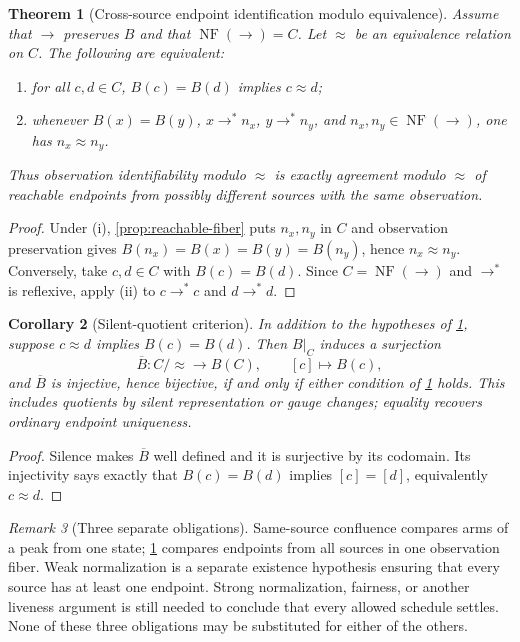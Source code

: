 \documentclass[11pt]{article}
\newtheorem{theorem}{Theorem}[section]
\newtheorem{corollary}[theorem]{Corollary}
\theoremstyle{definition}
\theoremstyle{remark}
\newtheorem{remark}[theorem]{Remark}
\numberwithin{equation}{section}
\newcommand{\NF}{\operatorname{NF}}
\begin{document}
\begin{theorem}[Cross-source endpoint identification modulo equivalence]
\label{thm:cross-source-modulo}
Assume that $\to$ preserves $B$ and that $\NF(\to)=C$.  Let $\approx$ be
an equivalence relation on $C$.  The following are equivalent:
\begin{enumerate}[label=(\roman*)]
\item for all $c,d\in C$, $B(c)=B(d)$ implies $c\approx d$;
\item whenever $B(x)=B(y)$, $x\to^*n_x$, $y\to^*n_y$, and
      $n_x,n_y\in\NF(\to)$, one has $n_x\approx n_y$.
\end{enumerate}
Thus observation identifiability modulo $\approx$ is exactly agreement modulo
$\approx$ of reachable endpoints from \emph{possibly different} sources with
the same observation.
\end{theorem}

\begin{proof}
Under (i), \cref{prop:reachable-fiber} puts $n_x,n_y$ in $C$ and observation
preservation gives $B(n_x)=B(x)=B(y)=B(n_y)$, hence $n_x\approx n_y$.
Conversely, take $c,d\in C$ with $B(c)=B(d)$.  Since $C=\NF(\to)$ and
$\to^*$ is reflexive, apply (ii) to $c\to^*c$ and $d\to^*d$.
\end{proof}

\begin{corollary}[Silent-quotient criterion]\label{cor:silent-quotient}
In addition to the hypotheses of \cref{thm:cross-source-modulo}, suppose
$c\approx d$ implies $B(c)=B(d)$.  Then $B|_C$ induces a surjection
\[
 \overline B:C/{\approx}\longrightarrow B(C),\qquad [c]\longmapsto B(c),
\]
and $\overline B$ is injective, hence bijective, if and only if either
condition of \cref{thm:cross-source-modulo} holds.  This includes quotients by
silent representation or gauge changes; equality recovers ordinary endpoint
uniqueness.
\end{corollary}

\begin{proof}
Silence makes $\overline B$ well defined and it is surjective by its
codomain.  Its injectivity says exactly that $B(c)=B(d)$ implies
$[c]=[d]$, equivalently $c\approx d$.
\end{proof}

\begin{remark}[Three separate obligations]
Same-source confluence compares arms of a peak from one state;
\cref{thm:cross-source-modulo} compares endpoints from all sources in one
observation fiber.  Weak normalization is a separate existence hypothesis
ensuring that every source has at least one endpoint.  Strong normalization,
fairness, or another liveness argument is still needed to conclude that every
allowed schedule settles.  None of these three obligations may be substituted
for either of the others.
\end{remark}
\end{document}
